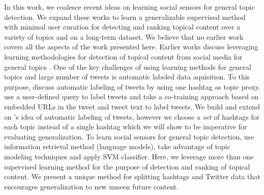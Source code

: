 In this work, we coalesce recent ideas on learning social sensors for general topic detection. We expand these works to learn a generalizable supervised method with minimal user curation for detecting and ranking topical content over a variety of topics and on a long-term dataset. We believe that no earlier work covers all the aspects of the work presented here.
Earlier works discuss leveraging learning methodologies for detection of topical content from social media for general topics \citep{lin2011smoothing,yang2014large,magdy}. One of the key challenges of using learning methods for general topics and large number of tweets is automatic labeled data aquisition. To this purpose, \cite{lin2011smoothing} discuss automatic labeling of tweets by using one hashtag as topic proxy. \cite{magdy} use a user-defined query to label tweets and \cite{yang2014large} take a co-training approach based on embedded URLs in the tweet and tweet text to label tweets. We build and extend on \citep{lin2011smoothing}'s idea of automatic labeling of tweets, however we choose a \emph{set} of hashtags for each topic instead of a single hashtag which we will show to be imperative for evaluating generalization. To learn social sensors for general topic detection, \citep{lin2011smoothing} use information retrieval method (language models), \cite{yang2014large} take advantage of topic modeling techniques and \cite{magdy} apply SVM classifier. Here, we leverage more than one supervised learning method for the purpose of detection and ranking of topical content. We present a unique method for splitting hashtags and Twitter data that encourages generalization to new unseen future content. 
